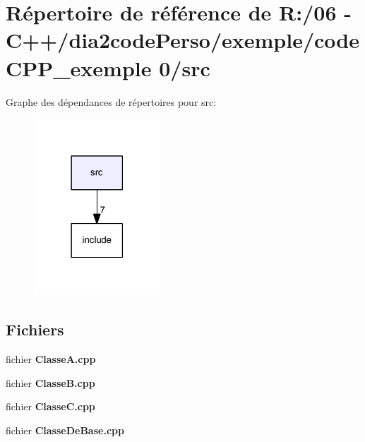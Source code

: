 \section{Répertoire de référence de R\+:/06 -\/ C++/dia2code\+Perso/exemple/code\+C\+P\+P\+\_\+exemple 0/src}
\label{dir_68267d1309a1af8e8297ef4c3efbcdba}
Graphe des dépendances de répertoires pour src\+:
\nopagebreak
\begin{figure}[H]
\begin{center}
\leavevmode
\includegraphics[width=134pt]{dir_68267d1309a1af8e8297ef4c3efbcdba_dep}
\end{center}
\end{figure}
\subsection*{Fichiers}
\begin{DoxyCompactItemize}
\item 
fichier {\bf Classe\+A.\+cpp}
\item 
fichier {\bf Classe\+B.\+cpp}
\item 
fichier {\bf Classe\+C.\+cpp}
\item 
fichier {\bf Classe\+De\+Base.\+cpp}
\end{DoxyCompactItemize}
